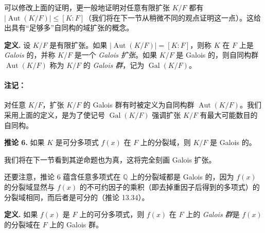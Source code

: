 可以修改上面的证明，更一般地证明对任意有限扩张 $K/F$ 都有 $|\operatorname{Aut}(K/F)|\leq [K:F]$（我们将在下一节从稍微不同的观点证明这一点）。这给出具有“足够多”自同构的域扩张的概念。

\noindent\textbf{定义.} 设 $K/F$ 是有限扩张。如果 $|\operatorname{Aut}(K/F)|=[K:F]$，则称 $K$ 在 $F$ 上是 \emph{Galois} 的，并称 $K/F$ 是一个 \emph{Galois 扩张}。如果 $K/F$ 是 Galois 的，则自同构群 $\operatorname{Aut}(K/F)$ 称为 $K/F$ 的 \emph{Galois 群}，记为 $\operatorname{Gal}(K/F)$。

\paragraph{注记：} 对任意 $K/F$，扩张 $K/F$ 的 Galois 群有时被定义为自同构群 $\operatorname{Aut}(K/F)$。我们采用上面的定义，是为了使记号 $\operatorname{Gal}(K/F)$ 强调扩张 $K/F$ 有最大可能数目的自同构。

\noindent\textbf{推论 6.} 如果 $K$ 是可分多项式 $f(x)$ 在 $F$ 上的分裂域，则 $K/F$ 是 Galois 的。

我们将在下一节看到其逆命题也为真，这将完全刻画 Galois 扩张。

还要注意，推论 6 蕴含任意多项式在 $\mathbb Q$ 上的分裂域都是 Galois 的，因为 $f(x)$ 的分裂域显然与 $f(x)$ 的不可约因子的乘积（即去掉重因子后得到的多项式）的分裂域相同，而后者是可分的（推论 13.34）。

\noindent\textbf{定义.} 如果 $f(x)$ 是 $F$ 上的可分多项式，则 $f(x)$ 在 $F$ 上的 \emph{Galois 群}是 $f(x)$ 的分裂域在 $F$ 上的 Galois 群。

